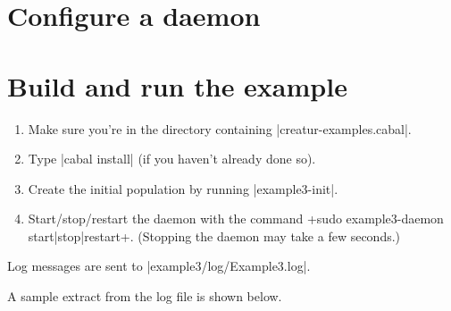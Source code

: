 \documentclass[a4paper,10pt]{report}
\begin{document}


\section{Configure a daemon}
\label{sec:daemon3}



\section{Build and run the example}
\label{sec:run3}

\begin{enumerate}
\item Make sure you're in the directory containing |creatur-examples.cabal|.
\item Type |cabal install| (if you haven't already done so).
\item Create the initial population by running |example3-init|.
\item Start/stop/restart the daemon with the command
\UndefineShortVerb{\|}
\DefineShortVerb{\+}
+sudo example3-daemon start|stop|restart+.
\UndefineShortVerb{\+}
\DefineShortVerb{\|}
(Stopping the daemon may take a few seconds.)
\end{enumerate}

Log messages are sent to |example3/log/Example3.log|.

A sample extract from the log file is shown below.
\end{document}
